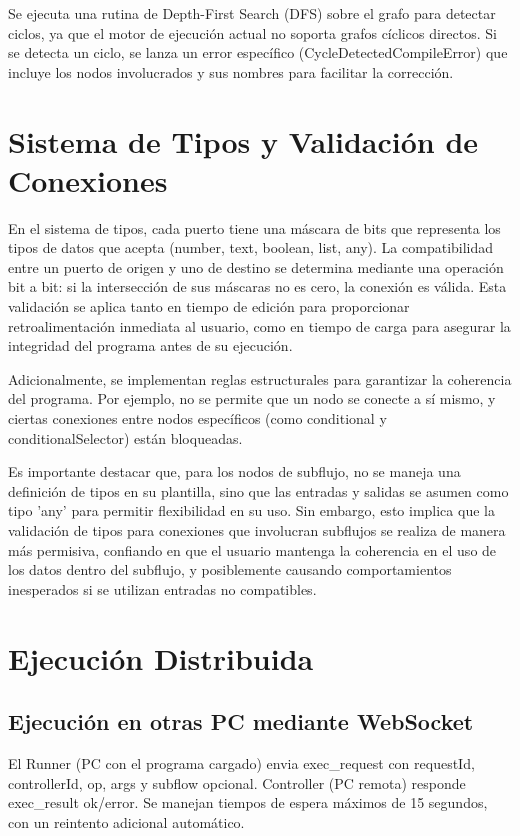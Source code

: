 Se ejecuta una rutina de Depth-First Search (DFS) sobre el grafo para detectar ciclos, ya que el motor de ejecución actual no soporta grafos cíclicos directos. Si se detecta un ciclo, se lanza un error específico (CycleDetectedCompileError) que incluye los nodos involucrados y sus nombres para facilitar la corrección.

\section*{Sistema de Tipos y Validación de Conexiones}

En el sistema de tipos, cada puerto tiene una máscara de bits que representa los tipos de datos que acepta (number, text, boolean, list, any). La compatibilidad entre un puerto de origen y uno de destino se determina mediante una operación bit a bit: si la intersección de sus máscaras no es cero, la conexión es válida. Esta validación se aplica tanto en tiempo de edición para proporcionar retroalimentación inmediata al usuario, como en tiempo de carga para asegurar la integridad del programa antes de su ejecución.

Adicionalmente, se implementan reglas estructurales para garantizar la coherencia del programa. Por ejemplo, no se permite que un nodo se conecte a sí mismo, y ciertas conexiones entre nodos específicos (como conditional y conditionalSelector) están bloqueadas.

Es importante destacar que, para los nodos de subflujo, no se maneja una definición de tipos en su plantilla, sino que las entradas y salidas se asumen como tipo 'any' para permitir flexibilidad en su uso. Sin embargo, esto implica que la validación de tipos para conexiones que involucran subflujos se realiza de manera más permisiva, confiando en que el usuario mantenga la coherencia en el uso de los datos dentro del subflujo, y posiblemente causando comportamientos inesperados si se utilizan entradas no compatibles.

\section*{Ejecución Distribuida}

\subsection*{Ejecución en otras PC mediante WebSocket}

El Runner (PC con el programa cargado) envia exec\_request con requestId, controllerId, op, args y subflow opcional. Controller (PC remota) responde exec\_result ok/error. Se manejan tiempos de espera máximos de 15 segundos, con un reintento adicional automático.

